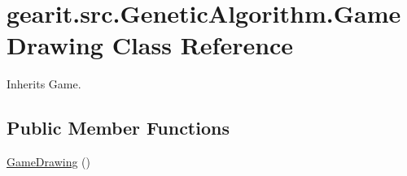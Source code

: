 \hypertarget{classgearit_1_1src_1_1_genetic_algorithm_1_1_game_drawing}{\section{gearit.\+src.\+Genetic\+Algorithm.\+Game\+Drawing Class Reference}
\label{classgearit_1_1src_1_1_genetic_algorithm_1_1_game_drawing}
}


Inherits Game.

\subsection*{Public Member Functions}
\begin{DoxyCompactItemize}
\item 
\hyperlink{classgearit_1_1src_1_1_genetic_algorithm_1_1_game_drawing_a3711b923f8389474e12d93aeb2cc1569}{Game\+Drawing} ()
\end{DoxyCompactItemize}
